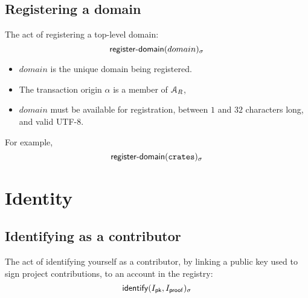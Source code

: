 \subsection{Registering a domain}
The act of registering a top-level domain:
\[
    \operatorname{\mathsf{register-domain}}\lparen domain\rparen_\sigma
\]
\begin{itemize}
    \item $domain$ is the unique domain being registered.
\end{itemize}
\validation
\begin{itemize}
    \item The transaction origin $\alpha$ is a member of $\mathcal{A}_R$,
    \item $domain$ must be available for registration, between $1$ and $32$
        characters long, and valid \textsf{UTF-8}.
\end{itemize}
For example,
\[
    \operatorname{\mathsf{register-domain}}\lparen\mathtt{crates}\rparen_\sigma
\]

\section{Identity}

\subsection{Identifying as a contributor}
The act of identifying yourself as a contributor, by linking a public key used
to sign project contributions, to an account in the registry:
\[
    \operatorname{\mathsf{identify}}\lparen I_{\mathsf{pk}}, I_{\mathsf{proof}}\rparen_\sigma
\]


